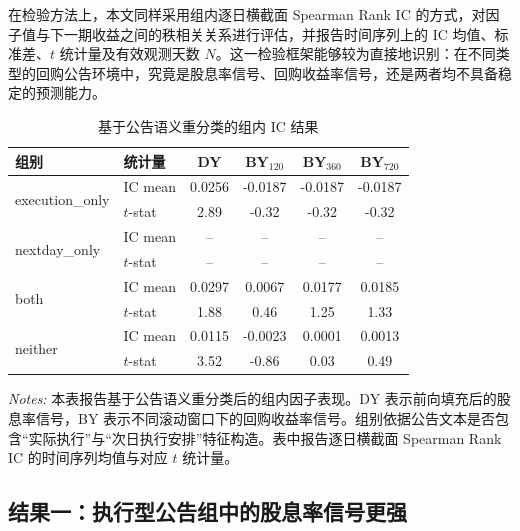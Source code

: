 \documentclass[a4paper,10pt]{article}
\begin{document}
在检验方法上，本文同样采用组内逐日横截面 Spearman Rank IC 的方式，对因子值与下一期收益之间的秩相关关系进行评估，并报告时间序列上的 IC 均值、标准差、$t$ 统计量及有效观测天数 $N$。这一检验框架能够较为直接地识别：在不同类型的回购公告环境中，究竟是股息率信号、回购收益率信号，还是两者均不具备稳定的预测能力。

\begin{table}[H]
\centering
\caption{基于公告语义重分类的组内 IC 结果}
\label{tab:semantic_group_ic}
\small
\begin{tabular}{llcccc}
\toprule
组别 & 统计量 & DY & BY$_{120}$ & BY$_{360}$ & BY$_{720}$ \\
\midrule

\multirow{2}{*}{execution\_only}
& IC mean & 0.0256 & -0.0187 & -0.0187 & -0.0187 \\
& $t$-stat & 2.89 & -0.32 & -0.32 & -0.32 \\

\midrule

\multirow{2}{*}{nextday\_only}
& IC mean & -- & -- & -- & -- \\
& $t$-stat & -- & -- & -- & -- \\

\midrule

\multirow{2}{*}{both}
& IC mean & 0.0297 & 0.0067 & 0.0177 & 0.0185 \\
& $t$-stat & 1.88 & 0.46 & 1.25 & 1.33 \\

\midrule

\multirow{2}{*}{neither}
& IC mean & 0.0115 & -0.0023 & 0.0001 & 0.0013 \\
& $t$-stat & 3.52 & -0.86 & 0.03 & 0.49 \\

\bottomrule
\end{tabular}
\vspace{0.5em}
\begin{minipage}{0.9\textwidth}
\footnotesize
\textit{Notes:} 本表报告基于公告语义重分类后的组内因子表现。DY 表示前向填充后的股息率信号，BY 表示不同滚动窗口下的回购收益率信号。组别依据公告文本是否包含“实际执行”与“次日执行安排”特征构造。表中报告逐日横截面 Spearman Rank IC 的时间序列均值与对应 $t$ 统计量。
\end{minipage}
\end{table}

\subsection{结果一：执行型公告组中的股息率信号更强}
\end{document}

